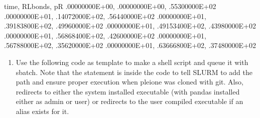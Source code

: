\documentclass[letterpaper,10pt,english]{sphinxmanual}
\begin{document}
\begin{sphinxVerbatim}[commandchars=\\\{\}]
time, RLbonds, pR
.00000000E+00, .00000000E+00, .55300000E+02
.00000000E+01, .14072000E+02, .56440000E+02
.00000000E+01, .39183800E+02, .49960000E+02
.00000000E+01, .49153400E+02, .43980000E+02
.00000000E+01, .56868400E+02, .42600000E+02
.00000000E+01, .56788000E+02, .35620000E+02
.00000000E+01, .63666800E+02, .37480000E+02
\end{sphinxVerbatim}
\begin{enumerate}
\def\theenumi{\arabic{enumi}}
\def\labelenumi{\theenumi .}
\makeatletter\def\p@enumii{\p@enumi \theenumi .}\makeatother
\setcounter{enumi}{1}
\item {} 

Use the following code as template to make a shell script and queue it with
sbatch. Note that the  statement is inside the code to tell SLURM
to add the path and ensure proper execution when pleione was cloned with
git. Also,  redirects to either the system installed executable
(with pandas installed either as admin or user) or redirects to the user
compiled executable if an alias exists for it.

\end{enumerate}
\end{document}
